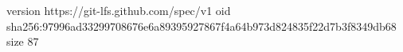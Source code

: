 version https://git-lfs.github.com/spec/v1
oid sha256:97996ad33299708676e6a89395927867f4a64b973d824835f22d7b3f8349db68
size 87
